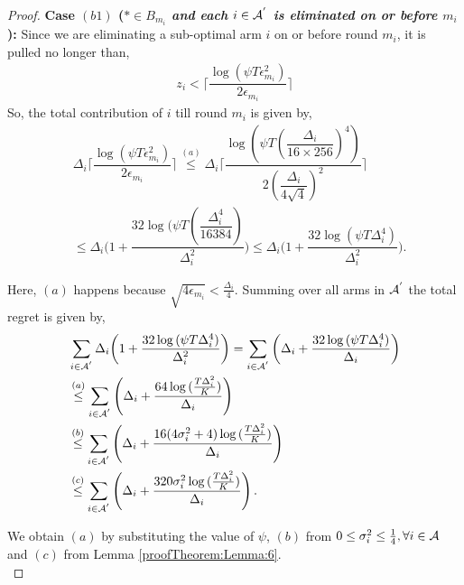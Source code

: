 \begin{proof}
\noindent
\textbf{Case $(b1)$ (\textit{${*}\in B_{m_{i}}$ and each ${i}\in \mathcal{A}^{'}$ is  eliminated on or before $m_{i}$ }): } Since we are eliminating a sub-optimal arm ${i}$ on or before round $m_{i}$, it is pulled no longer than, 
 \begin{align*}
 z_{i} < \bigg\lceil\dfrac{\log{(\psi T\epsilon_{m_{i}}^{2})}}{2\epsilon_{m_{i}}}\bigg\rceil
 \end{align*}
So, the total contribution of ${i}$  till round $m_{i}$ is given by, 
\begin{align*}
&\Delta_{i}\bigg\lceil\dfrac{\log{(\psi T\epsilon_{m_{i}}^{2})}}{2\epsilon_{m_{i}}}\bigg\rceil
\overset{(a)}{\leq}    \Delta_{i}\bigg\lceil\dfrac{\log{(\psi T(\dfrac{\Delta_{i}}{16 \times 256})^{4})}}{2(\dfrac{\Delta_{i}}{4\sqrt{4}})^{2}}\bigg\rceil \\
&\leq   \Delta_{i}\bigg(1+\dfrac{32\log{(\psi T(\dfrac{\Delta_{i}^{4}}{16384})}}{\Delta_{i}^{2}}\bigg)
\leq \Delta_{i}\bigg(1+\dfrac{32\log{(\psi T\Delta_{i}^{4})}}{\Delta_{i}^{2}}\bigg) .
\end{align*} 

Here, $(a)$ happens because $\sqrt{4\epsilon_{m_{i}}} < \frac{\Delta_{i}}{4}$. Summing over all arms in $\mathcal{A}^{'}$ the total regret is given by, 
\begin{align*}
&\sum_{i\in \A^{'}}\Delta_{i}\bigg(1+\dfrac{32\log{(\psi T\Delta_{i}^{4}})}{\Delta_{i}^{2}}\bigg) = \sum_{i\in \A^{'}}\bigg(\Delta_{i} +\dfrac{32\log{(\psi T\Delta_{i}^{4}})}{\Delta_{i}}\bigg) \\
&\overset{(a)}{\leq} \sum_{i\in \A^{'}} \left(\Delta_{i}+\dfrac{64\log{( \frac{T\Delta_{i}^{2}}{K})}}{\Delta_{i}}\right)\\
&\overset{(b)}{\leq} \sum_{i\in \A^{'}} \left(\Delta_{i} +\dfrac{16(4\sigma_i^2 + 4)\log{( \frac{T\Delta_{i}^{2}}{K})}}{\Delta_{i}}\right)\\
&%
\overset{(c)}{\leq} \sum_{i\in \A^{'}} \left(\Delta_{i} +\dfrac{320\sigma_i^2\log{( \frac{T\Delta_{i}^{2}}{K})}}{\Delta_{i}}\right).\\
\end{align*}

We obtain $(a)$ by substituting the value of $\psi$, $(b)$ from $0\leq\sigma_i^2 \leq\frac{1}{4},\forall i\in \mathcal{A}$ and $(c)$ from Lemma \ref{proofTheorem:Lemma:6}.\\


\end{proof}
